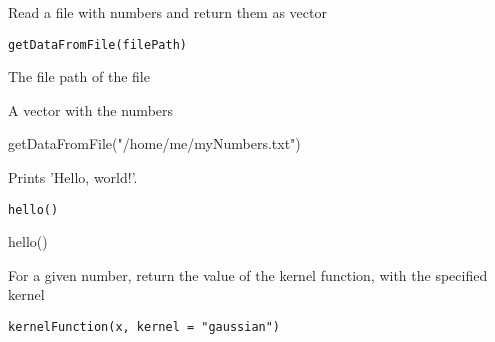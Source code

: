 \documentclass[letterpaper]{book}
\begin{document}
%
\begin{Description}\relax
Read a file with numbers and return them as vector
\end{Description}
%
\begin{Usage}
\begin{verbatim}
getDataFromFile(filePath)
\end{verbatim}
\end{Usage}
%
\begin{Arguments}
\begin{ldescription}
\item[\code{filePath}] The file path of the file
\end{ldescription}
\end{Arguments}
%
\begin{Value}
A vector with the numbers
\end{Value}
%
\begin{Examples}
\begin{ExampleCode}
getDataFromFile("/home/me/myNumbers.txt")

\end{ExampleCode}
\end{Examples}
%
\begin{Description}\relax
Prints 'Hello, world!'.
\end{Description}
%
\begin{Usage}
\begin{verbatim}
hello()
\end{verbatim}
\end{Usage}
%
\begin{Examples}
\begin{ExampleCode}
hello()
\end{ExampleCode}
\end{Examples}
%
\begin{Description}\relax
For a given number, return the value of the kernel function, with the specified kernel
\end{Description}
%
\begin{Usage}
\begin{verbatim}
kernelFunction(x, kernel = "gaussian")
\end{verbatim}
\end{Usage}
%
\end{document}
